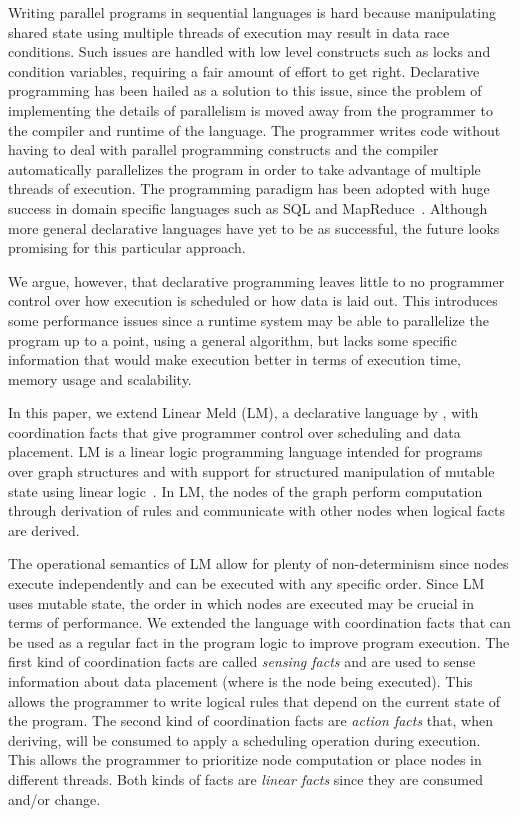 
Writing parallel programs in sequential languages is hard because manipulating
shared state using multiple threads of execution may result in data race
conditions. Such issues are handled with low level constructs such as locks and
condition variables, requiring a fair amount of effort to get right.
Declarative programming has been hailed as a solution to this issue, since the
problem of implementing the details of parallelism is moved away from the programmer to the
compiler and runtime of the language. The programmer writes code
without having to deal with parallel programming constructs and the compiler
automatically parallelizes the program in order to take advantage of
multiple threads of execution.
The programming paradigm has been adopted with huge success in domain specific
languages such as SQL and MapReduce~\cite{Dean:2008:MSD:1327452.1327492}.
Although more general declarative languages have yet to be as successful, the
future looks promising for this particular approach.

We argue, however, that declarative programming leaves little to no programmer control
over how execution is scheduled or how data is laid out. This introduces some
performance issues since a runtime system may be able to parallelize the program
up to a point, using a general algorithm, but lacks some specific information that would make
execution better in terms of execution time, memory usage and scalability.

In this paper, we extend Linear Meld (LM), a declarative language by
\cite{cruz-iclp14}, with coordination facts that give programmer control over
scheduling and data placement. LM is a linear logic programming language
intended for programs over graph structures and with
support for structured manipulation of mutable state using 
linear logic~\cite{girard-87}. In LM, the nodes of the graph perform computation
through derivation of rules and communicate with other nodes when logical facts
are derived.

The operational semantics of LM allow for plenty of
non-determinism since nodes execute independently and can be executed with
any specific order. Since LM uses mutable state, the order in which nodes are
executed may be crucial in terms of performance. We extended the language with
coordination facts that can be used as a regular fact in the program logic to
improve program execution.
The first kind of coordination facts are
called \emph{sensing facts} and are used to sense information about data
placement (where is the node being executed). This allows the programmer to
write logical rules that depend on the current state of the program. The second
kind of coordination facts are \emph{action facts} that, when deriving, will be
consumed to apply a scheduling operation during execution. This allows the
programmer to prioritize node computation or place nodes in different threads.
Both kinds of facts are \emph{linear facts} since they are consumed and/or change.

